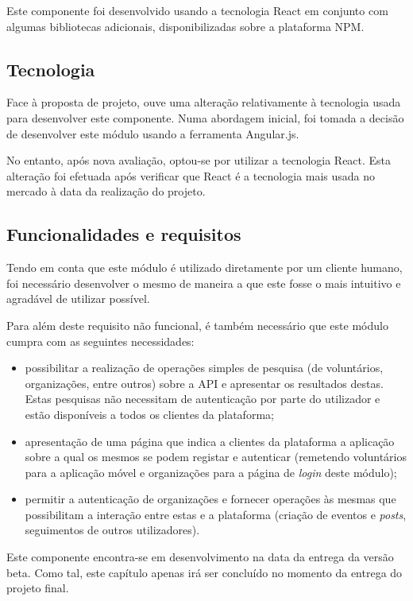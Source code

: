 \par \medskip

Este componente foi desenvolvido usando a tecnologia React em conjunto com algumas bibliotecas adicionais, disponibilizadas sobre a plataforma NPM.

\subsection{Tecnologia}

Face à proposta de projeto, ouve uma alteração relativamente à tecnologia usada para desenvolver este componente. Numa abordagem inicial, foi tomada a decisão de desenvolver este módulo usando a ferramenta Angular.js. \par \medskip

No entanto, após nova avaliação, optou-se por utilizar a tecnologia React. Esta alteração foi efetuada após verificar que React é a tecnologia mais usada no mercado à data da realização do projeto. \par \medskip

\subsection{Funcionalidades e requisitos}

Tendo em conta que este módulo é utilizado diretamente por um cliente humano, foi necessário desenvolver o mesmo de maneira a que este fosse o mais intuitivo e agradável de utilizar possível. 

\par \medskip

Para além deste requisito não funcional, é também necessário que este módulo cumpra com as seguintes necessidades:

\begin{itemize}
	\item possibilitar a realização de operações simples de pesquisa (de voluntários, organizações, entre outros) sobre a API e apresentar os resultados destas. Estas pesquisas não necessitam de autenticação por parte do utilizador e estão disponíveis a todos os clientes da plataforma;
	\item apresentação de uma página que indica a clientes da plataforma a aplicação sobre a qual os mesmos se podem registar e autenticar (remetendo voluntários para a aplicação móvel e organizações para a página de \textit{login} deste módulo);
	\item permitir a autenticação de organizações e fornecer operações às mesmas que possibilitam a interação entre estas e a plataforma (criação de eventos e \textit{posts}, seguimentos de outros utilizadores).
\end{itemize}

\bigskip \bigskip

Este componente encontra-se em desenvolvimento na data da entrega da versão beta. Como tal, este capítulo apenas irá ser concluído no momento da entrega do projeto final.

\fi
